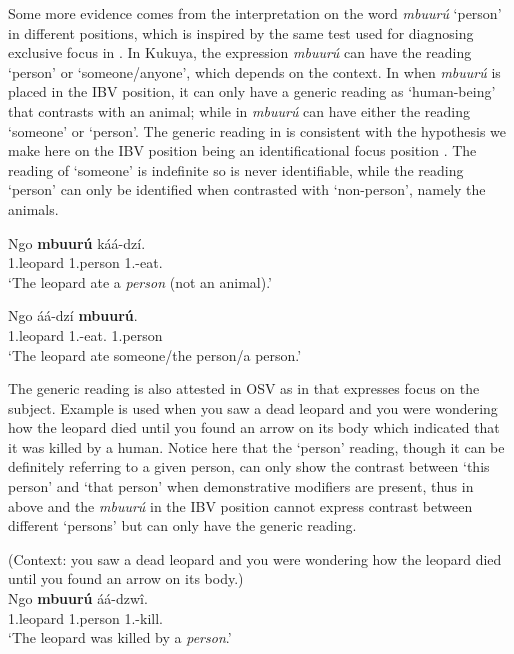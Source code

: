 \documentclass[output=paper,colorlinks,citecolor=brown,
]{langscibook}
\begin{document}
Some more evidence comes from the interpretation on the word \textit{mbuurú} `person' in different positions, which is inspired by the same test used for diagnosing exclusive focus in \citet{vanderWal2016}. In Kukuya, the expression \textit{mbuurú} can have the reading `person' or `someone/anyone', which depends on the context. In  when \textit{mbuurú} is placed in the IBV position, it can only have a generic reading as `human-being' that contrasts with an animal; while in  \textit{mbuurú} can have either the reading `someone' or `person'. The generic reading in  is consistent with the hypothesis we make here on the IBV position being an identificational focus position \citep{vanderWal2016, vanderWal2021a}. The reading of `someone' is indefinite so is never identifiable, while the reading `person' can only be identified when contrasted with `non-person', namely the animals.
\begin{exe}
     \ex \label{80}
    \begin{xlist}
\ex
\label{80a}
\gll
Ngo \textbf{mbuurú} káá-dzí.\\
1.leopard 1.person 1\Sm{}.\Pst{}-eat.\Pst{}\\
\trans ‘The leopard ate a \textit{person} (not an animal).’

\ex
\label{80b}
\gll
Ngo áá-dzí \textbf{mbuurú}.\\
1.leopard 1\Sm{}.\Pst{}-eat.\Pst{} 1.person\\
\trans ‘The leopard ate someone/the person/a person.’

    \end{xlist}
\end{exe}
The generic reading is also attested in OSV as in  that expresses focus on the subject. Example  is used when you saw a dead leopard and you were wondering how the leopard died until you found an arrow on its body which indicated that it was killed by a human. Notice here that the `person' reading, though it can be definitely referring to a given person, can only show the contrast between  `this person' and `that person' when demonstrative modifiers are present, thus in  above and  the \textit{mbuurú} in the IBV position cannot express contrast between different `persons' but can only have the generic reading.
\begin{exe}
\ex
\label{81}
 (Context: you saw a dead leopard and you were wondering how the leopard died until you found an arrow on its body.)\\
\gll
Ngo \textbf{mbuurú} áá-dzwî.\\
1.leopard 1.person 1\Sm{}.\Pst{}-kill.\Pst{}\\
\trans ‘The leopard was killed by a \textit{person}.’

\end{exe}
\end{document}
